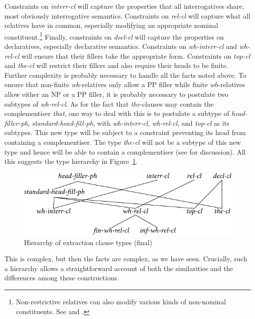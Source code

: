 \documentclass[output=paper
                ,modfonts
                ,nonflat
	        ,collection
	        ,collectionchapter
	        ,collectiontoclongg
 	        ,biblatex
                ,babelshorthands
                ,newtxmath
                ,draftmode
                ,colorlinks, citecolor=brown
]{./langsci/langscibook}
\begin{document}
{\noindent
Constraints on \emph{interr-cl} will capture the properties that all
interrogatives share, most obviously interrogative semantics.
Constraints on \emph{rel-cl} will capture what all relatives have in
common, especially modifying an appropriate nominal
constituent.\footnote{Non-restrictive relatives can also modify various
  kinds of non-nominal constituents. See \citet{Arnold:04} and
  \citet{Arnold:Borsley:08}.} Finally, constraints on \emph{decl-cl}
will capture the properties on declaratives, especially declarative
semantics.  Constraints on \emph{wh-interr-cl} and \emph{wh-rel-cl}
will ensure that their fillers take the appropriate form. Constraints
on \emph{top-cl} and \emph{the-cl} will restrict their fillers and
also require their heads to be finite. Further complexity is probably
necessary to handle all the facts noted above. To ensure that
non-finite \emph{wh}-relatives only allow a PP filler while finite
\emph{wh}-relatives allow either an NP or a PP filler, it is probably
necessary to postulate two subtypes of \emph{wh-rel-cl}. As for the
fact that \emph{the}-clauses may contain the complementiser
\emph{that}, one way to deal with this is to postulate a subtype of
\emph{head-filler-ph}, \emph{standard-head-fill-ph}, with
\emph{wh-interr-cl}, \emph{wh-rel-cl}, and \emph{top-cl} as its
subtypes. This new type will be subject to a constraint preventing its
head from containing a complementiser. The type \emph{the-cl} will not
be a subtype of this new type and hence will be able to contain a
complementiser (see \citealt{Borsley:11} for discussion). All this suggests
the type hierarchy in Figure~\ref{fig:UDC:50}. 
%
\begin{figure}[htb]
  \centering
  \includegraphics{figures/BB-extraction-function-hier-full-crop}
  \caption{\label{fig:UDC:50}Hierarchy of extraction clause types (final)}
  
\end{figure}
%
%
This is complex, but then the facts are complex, as we have seen.
Crucially, such a hierarchy allows a straightforward account of both the
similarities and the differences among these constructions.

}
\end{document}
